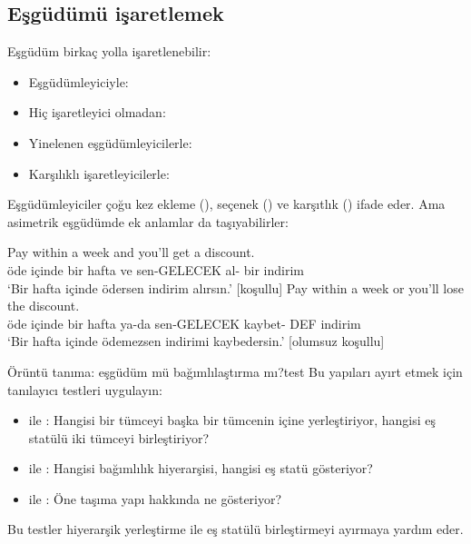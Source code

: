 \subsection{Eşgüdümü işaretlemek}

Eşgüdüm birkaç yolla işaretlenebilir:
\begin{itemize}[noitemsep]
    \item Eşgüdümleyiciyle: 
    \item Hiç işaretleyici olmadan: 
    \item Yinelenen eşgüdümleyicilerle: 
    \item Karşılıklı işaretleyicilerle: 
\end{itemize}

Eşgüdümleyiciler çoğu kez ekleme (), seçenek () ve karşıtlık () ifade eder. Ama asimetrik eşgüdümde ek anlamlar da taşıyabilirler:

\ea \label{ex:coord-meaning-tr}
    \ea \gll Pay within a week and you'll get a discount.\\
        öde içinde bir hafta ve sen-GELECEK al- bir indirim\\
    \glt `Bir hafta içinde ödersen indirim alırsın.' [koşullu]
    \ex \gll Pay within a week or you'll lose the discount.\\
        öde içinde bir hafta ya-da sen-GELECEK kaybet- DEF indirim\\
    \glt `Bir hafta içinde ödemezsen indirimi kaybedersin.' [olumsuz koşullu]
    \z
\z

\begin{tblsframedsymbol}{Örüntü tanıma: eşgüdüm mü bağımlılaştırma mı?}{test}
Bu yapıları ayırt etmek için tanılayıcı testleri uygulayın:
\begin{itemize}[noitemsep, leftmargin=*]
    \item {} ile : Hangisi bir tümceyi başka bir tümcenin içine yerleştiriyor, hangisi eş statülü iki tümceyi birleştiriyor?
    \item {} ile : Hangisi bağımlılık hiyerarşisi, hangisi eş statü gösteriyor?
    \item {} ile : Öne taşıma yapı hakkında ne gösteriyor?
\end{itemize}
Bu testler hiyerarşik yerleştirme ile eş statülü birleştirmeyi ayırmaya yardım eder.
\end{tblsframedsymbol}

